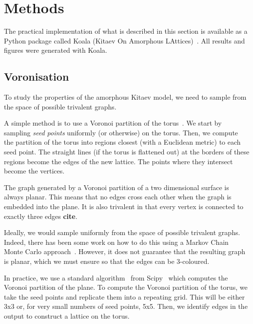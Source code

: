 \begin{Shaded}
\begin{Highlighting}[]

\end{Highlighting}
\end{Shaded}

\hypertarget{methods}{%
\section{Methods}\label{methods}}

The practical implementation of what is described in this section is available as a Python package called Koala (Kitaev On Amorphous LAttices)~\autocite{tomImperialCMTHKoalaFirst2022}. All results and figures were generated with Koala.

\hypertarget{voronisation}{%
\subsection{Voronisation}\label{voronisation}}

To study the properties of the amorphous Kitaev model, we need to sample from the space of possible trivalent graphs.

A simple method is to use a Voronoi partition of the torus~\autocite{mitchellAmorphousTopologicalInsulators2018,marsalTopologicalWeaireThorpeModels2020,florescu_designer_2009}. We start by sampling \emph{seed points} uniformly (or otherwise) on the torus. Then, we compute the partition of the torus into regions closest (with a Euclidean metric) to each seed point. The straight lines (if the torus is flattened out) at the borders of these regions become the edges of the new lattice. The points where they intersect become the vertices.

The graph generated by a Voronoi partition of a two dimensional surface is always planar. This means that no edges cross each other when the graph is embedded into the plane. It is also trivalent in that every vertex is connected to exactly three edges \textbf{cite}.

Ideally, we would sample uniformly from the space of possible trivalent graphs. Indeed, there has been some work on how to do this using a Markov Chain Monte Carlo approach~\autocite{alyamiUniformSamplingDirected2016}. However, it does not guarantee that the resulting graph is planar, which we must ensure so that the edges can be 3-coloured.

In practice, we use a standard algorithm~\autocite{barberQuickhullAlgorithmConvex1996} from Scipy~\autocite{virtanenSciPyFundamentalAlgorithms2020} which computes the Voronoi partition of the plane. To compute the Voronoi partition of the torus, we take the seed points and replicate them into a repeating grid. This will be either 3x3 or, for very small numbers of seed points, 5x5. Then, we identify edges in the output to construct a lattice on the torus.

